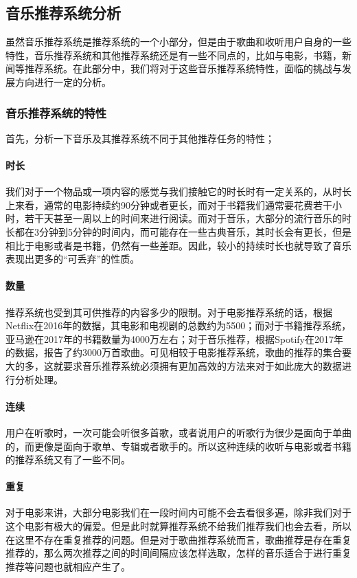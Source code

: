 \subsection{音乐推荐系统分析}
虽然音乐推荐系统是推荐系统的一个小部分，但是由于歌曲和收听用户自身的一些特性，音乐推荐系统和其他推荐系统还是有一些不同点的\cite{MusicComSurvey}，比如与电影，书籍，新闻等推荐系统。在此部分中，我们将对于这些音乐推荐系统特性，面临的挑战与发展方向进行一定的分析。

\subsubsection{音乐推荐系统的特性}
首先，分析一下音乐及其推荐系统不同于其他推荐任务的特性\cite{MusicComFeature}；
\paragraph{时长}
我们对于一个物品或一项内容的感觉与我们接触它的时长时有一定关系的，从时长上来看，通常的电影持续约90分钟或者更长，而对于书籍我们通常要花费若干小时，若干天甚至一周以上的时间来进行阅读。而对于音乐，大部分的流行音乐的时长都在3分钟到5分钟的时间内，而可能存在一些古典音乐，其时长会有更长，但是相比于电影或者是书籍，仍然有一些差距\cite{MusicComSurvey}。因此，较小的持续时长也就导致了音乐表现出更多的“可丢弃”的性质。

\paragraph{数量}
推荐系统也受到其可供推荐的内容多少的限制。对于电影推荐系统的话，根据Netflix在2016年的数据，其电影和电视剧的总数约为5500；而对于书籍推荐系统，亚马逊在2017年的书籍数量为4000万左右；对于音乐推荐，根据Spotify在2017年的数据，报告了约3000万首歌曲。\cite{MusicComSurvey}可见相较于电影推荐系统，歌曲的推荐的集合要大的多，这就要求音乐推荐系统必须拥有更加高效的方法来对于如此庞大的数据进行分析处理。

\paragraph{连续}
用户在听歌时，一次可能会听很多首歌，或者说用户的听歌行为很少是面向于单曲的，而更像是面向于歌单、专辑或者歌手的。所以这种连续的收听与电影或者书籍的推荐系统又有了一些不同。

\paragraph{重复}
对于电影来讲，大部分电影我们在一段时间内可能不会去看很多遍，除非我们对于这个电影有极大的偏爱。但是此时就算推荐系统不给我们推荐我们也会去看，所以在这里不存在重复推荐的问题。但是对于歌曲推荐系统而言，歌曲推荐是存在重复推荐的，那么两次推荐之间的时间间隔应该怎样选取，怎样的音乐适合于进行重复推荐等问题也就相应产生了。

